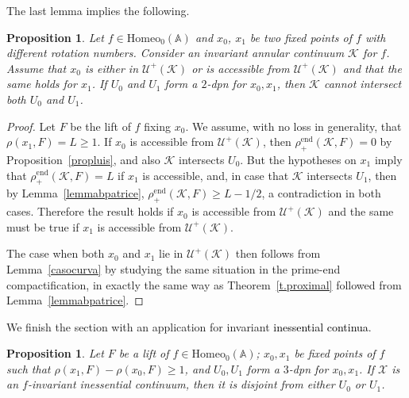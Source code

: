 \documentclass[12pt,a4paper]{amsart}
\newtheorem{prop}[thm]{Proposition}
\theoremstyle{definition}
\theoremstyle{remark}
\newcommand{\homeo}{\mathrm{Homeo}_0(\A)}
\newcommand{\A}{\mathbb{A}}
\begin{document}
The last lemma implies the following. 
\begin{prop}\label{maintechnical}
Let $f\in\mathrm{Homeo}_0(\A)$ and $x_0$, $x_1$ be two fixed points of $f$ with different rotation numbers. Consider an invariant annular continuum $\mathcal{K}$ for $f$. Assume that $x_0$ is either in $\mathcal{U}^{+}(\mathcal{K})$ or is accessible from $\mathcal{U}^{+}(\mathcal{K})$ and that the same holds for $x_1$. If $U_0$ and $U_1$ form a $2$-dpn for $x_0,x_1$, then $\mathcal{K}$ cannot intersect both $U_0$ and $U_1$.   
\end{prop}
\begin{proof}
Let $F$ be the lift of $f$ fixing $x_0$. We assume, with no loss in generality, that $\rho(x_1, F)=L\ge 1$. If $x_0$ is accessible from $\mathcal{U}^{+}(\mathcal{K})$, then $\rho^{\mathrm{end}}_+(\mathcal{K},F)=0$ by Proposition~\ref{propluis}, and also $\mathcal{K}$ intersects $U_0$. But the hypotheses on $x_1$ imply that 
$\rho^{\mathrm{end}}_+(\mathcal{K},F)=L$ if $x_1$ is accessible, and, in case that $\mathcal{K}$ intersects $U_1$, then by  Lemma~\ref{lemmabpatrice}, $\rho^{\mathrm{end}}_+(\mathcal{K},F)\ge L-1/2$, a contradiction in both cases. Therefore the result holds if $x_0$ is accessible from $\mathcal{U}^{+}(\mathcal{K})$ and the same must be true if $x_1$ is accessible from $\mathcal{U}^{+}(\mathcal{K})$. 

The case when both $x_0$ and $x_1$ lie in $\mathcal{U}^{+}(\mathcal{K})$ then follows from Lemma~\ref{casocurva} by studying the same situation in the prime-end compactification, in exactly the same way as Theorem~\ref{t.proximal} followed from Lemma~\ref{lemmabpatrice}.
\end{proof}

We finish the section with an application for invariant \textcolor{black}{inessential continua}.

\begin{prop}\label{t.maintechnical0}
Let $F$ be a lift of $f\in\homeo$; $x_0, x_1$ be fixed points of $f$ such that $\rho(x_1,F)-\rho(x_0,F)\geq 1$,  and $U_0, U_1$ form a $3$-dpn for $x_0,x_1$. If $\mathcal{X}$ is an $f$-invariant inessential
continuum, then it is disjoint from either $U_0$ or $U_1$.
\end{prop}

\end{document}
